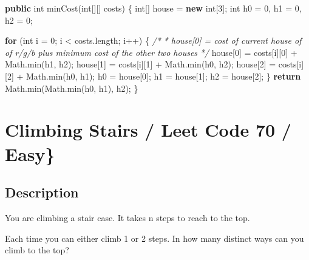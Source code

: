 \documentclass[]{book}
\newenvironment{Shaded}{\begin{snugshade}}{\end{snugshade}}
\newcommand{\BuiltInTok}[1]{#1}
\newcommand{\CommentTok}[1]{\textcolor[rgb]{0.56,0.35,0.01}{\textit{#1}}}
\newcommand{\DataTypeTok}[1]{\textcolor[rgb]{0.13,0.29,0.53}{#1}}
\newcommand{\DecValTok}[1]{\textcolor[rgb]{0.00,0.00,0.81}{#1}}
\newcommand{\FunctionTok}[1]{\textcolor[rgb]{0.00,0.00,0.00}{#1}}
\newcommand{\KeywordTok}[1]{\textcolor[rgb]{0.13,0.29,0.53}{\textbf{#1}}}
\newcommand{\NormalTok}[1]{#1}
\begin{document}
\begin{Shaded}
\begin{Highlighting}[]
\KeywordTok{public} \DataTypeTok{int} \FunctionTok{minCost}\NormalTok{(}\DataTypeTok{int}\NormalTok{[][] costs) \{}
    \DataTypeTok{int}\NormalTok{[] house = }\KeywordTok{new} \DataTypeTok{int}\NormalTok{[}\DecValTok{3}\NormalTok{];}
    \DataTypeTok{int}\NormalTok{ h0 = }\DecValTok{0}\NormalTok{, h1 = }\DecValTok{0}\NormalTok{, h2 = }\DecValTok{0}\NormalTok{;}

    \KeywordTok{for}\NormalTok{ (}\DataTypeTok{int}\NormalTok{ i = }\DecValTok{0}\NormalTok{; i < costs.}\FunctionTok{length}\NormalTok{; i++) \{}
        \CommentTok{/*}
\CommentTok{        * house[0] = cost of current house of of r/g/b plus minimum cost of the other two houses}
\CommentTok{        */}
\NormalTok{        house[}\DecValTok{0}\NormalTok{] = costs[i][}\DecValTok{0}\NormalTok{] + }\BuiltInTok{Math}\NormalTok{.}\FunctionTok{min}\NormalTok{(h1, h2);}
\NormalTok{        house[}\DecValTok{1}\NormalTok{] = costs[i][}\DecValTok{1}\NormalTok{] + }\BuiltInTok{Math}\NormalTok{.}\FunctionTok{min}\NormalTok{(h0, h2);}
\NormalTok{        house[}\DecValTok{2}\NormalTok{] = costs[i][}\DecValTok{2}\NormalTok{] + }\BuiltInTok{Math}\NormalTok{.}\FunctionTok{min}\NormalTok{(h0, h1);}
\NormalTok{        h0 = house[}\DecValTok{0}\NormalTok{];}
\NormalTok{        h1 = house[}\DecValTok{1}\NormalTok{];}
\NormalTok{        h2 = house[}\DecValTok{2}\NormalTok{];}
\NormalTok{    \}}
    \KeywordTok{return} \BuiltInTok{Math}\NormalTok{.}\FunctionTok{min}\NormalTok{(}\BuiltInTok{Math}\NormalTok{.}\FunctionTok{min}\NormalTok{(h0, h1), h2);}
\NormalTok{\}}
\end{Highlighting}
\end{Shaded}

\hypertarget{climbing-stairs-leet-code-70-easy}{%
\section{Climbing Stairs / Leet Code 70 / Easy\}}\label{climbing-stairs-leet-code-70-easy}}

\hypertarget{description-31}{%
\subsection{Description}\label{description-31}}

You are climbing a stair case. It takes n steps to reach to the top.

Each time you can either climb 1 or 2 steps. In how many distinct ways can you climb to the top?
\end{document}

